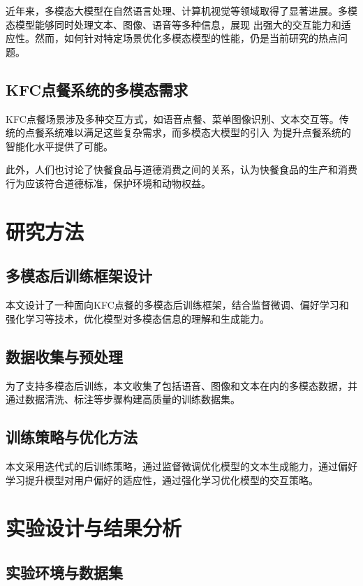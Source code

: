 \documentclass{xdupgthesis}
\begin{document}
近年来，多模态大模型在自然语言处理、计算机视觉等领域取得了显著进展。多模态模型能够同时处理文本、图像、语音等多种信息，展现
出强大的交互能力和适应性。然而，如何针对特定场景优化多模态模型的性能，仍是当前研究的热点问题。

\section{KFC点餐系统的多模态需求}

KFC点餐场景涉及多种交互方式，如语音点餐、菜单图像识别、文本交互等。传统的点餐系统难以满足这些复杂需求，而多模态大模型的引入
为提升点餐系统的智能化水平提供了可能。

此外，人们也讨论了快餐食品与道德消费之间的关系，认为快餐食品的生产和消费行为应该符合道德标准，保护环境和动物权益\cite{schroder2005fast}。


\chapter{研究方法}

\section{多模态后训练框架设计}

本文设计了一种面向KFC点餐的多模态后训练框架，结合监督微调、偏好学习和强化学习等技术，优化模型对多模态信息的理解和生成能力。

\section{数据收集与预处理}

为了支持多模态后训练，本文收集了包括语音、图像和文本在内的多模态数据，并通过数据清洗、标注等步骤构建高质量的训练数据集。

\section{训练策略与优化方法}

本文采用迭代式的后训练策略，通过监督微调优化模型的文本生成能力，通过偏好学习提升模型对用户偏好的适应性，通过强化学习优化模型的交互策略。

\chapter{实验设计与结果分析}

\section{实验环境与数据集}
\end{document}
